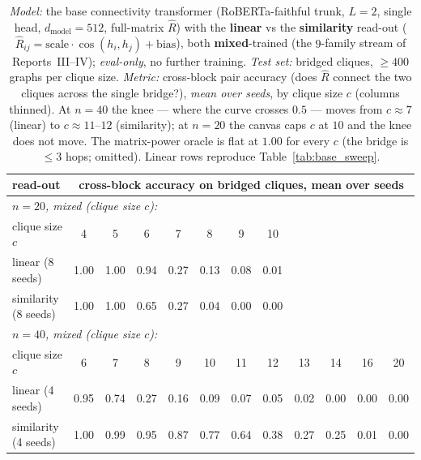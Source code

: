 \documentclass[11pt,a4paper]{article}
\begin{document}
\begin{table}[H]\centering\small\setlength{\tabcolsep}{4.5pt}
\begin{tabular}{lccccccccccc}
\toprule
read-out & \multicolumn{11}{c}{cross-block accuracy on bridged cliques, mean over seeds} \\
\midrule
\multicolumn{12}{l}{\emph{$n=20$, mixed (clique size $c$):}} \\
clique size $c$ & 4 & 5 & 6 & 7 & 8 & 9 & 10 & & & & \\
linear (8 seeds)      & 1.00 & 1.00 & 0.94 & 0.27 & 0.13 & 0.08 & 0.01 & & & & \\
similarity (8 seeds)  & 1.00 & 1.00 & 0.65 & 0.27 & 0.04 & 0.00 & 0.00 & & & & \\
\midrule
\multicolumn{12}{l}{\emph{$n=40$, mixed (clique size $c$):}} \\
clique size $c$ & 6 & 7 & 8 & 9 & 10 & 11 & 12 & 13 & 14 & 16 & 20 \\
linear (4 seeds)      & 0.95 & 0.74 & 0.27 & 0.16 & 0.09 & 0.07 & 0.05 & 0.02 & 0.00 & 0.00 & 0.00 \\
similarity (4 seeds)  & 1.00 & 0.99 & 0.95 & 0.87 & 0.77 & 0.64 & 0.38 & 0.27 & 0.25 & 0.01 & 0.00 \\
\bottomrule
\end{tabular}
\caption{\emph{Model:} the base connectivity transformer (RoBERTa-faithful trunk, $L=2$, single
head, $d_{\mathrm{model}}=512$, full-matrix $\hat R$) with the \textbf{linear} vs the
\textbf{similarity} read-out ($\hat R_{ij}=\mathrm{scale}\cdot\cos(h_i,h_j)+\mathrm{bias}$), both
\textbf{mixed}-trained (the $9$-family stream of Reports~III--IV); \emph{eval-only}, no further
training. \emph{Test set:} bridged cliques, $\ge400$ graphs per clique size. \emph{Metric:}
cross-block pair accuracy (does $\hat R$ connect the two cliques across the single bridge?),
\emph{mean over seeds}, by clique size $c$ (columns thinned). At $n=40$ the knee --- where the curve
crosses $0.5$ --- moves from $c\approx7$ (linear) to $c\approx11$--$12$ (similarity); at $n=20$ the
canvas caps $c$ at $10$ and the knee does not move. The matrix-power oracle is flat at $1.00$ for
every $c$ (the bridge is $\le3$ hops; omitted). Linear rows reproduce Table~\ref{tab:base_sweep}.}
\label{tab:sim_sweep}
\end{table}
\end{document}
